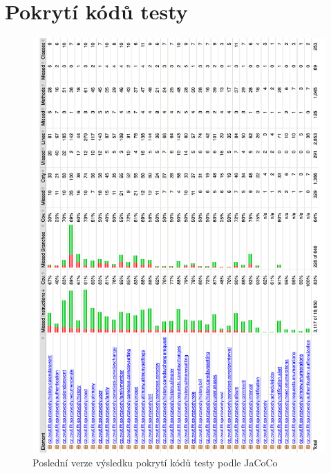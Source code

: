 \chapter{Pokrytí kódů testy}\label{dodatek:code-coverage}
    \begin{figure}\centering
	    \includegraphics[width=1.0\textwidth]{pdfs/JaCoCo-results}
	    \caption[Pokrytí kódů testy podle JaCoCo]{Poslední verze výsledku pokrytí kódů testy podle JaCoCo}\label{image:jacoco-results}
    \end{figure}
